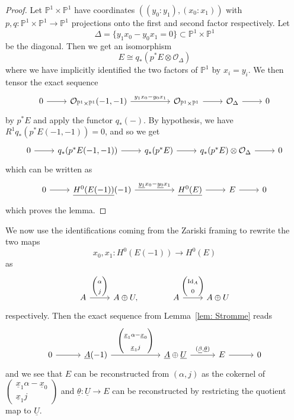 \documentclass{amsart}
\theoremstyle{definition}
\newcommand{\PP}{\mathbb{P}}
\newcommand{\OO}{\mathcal{O}}
\newcommand{\UL}[1]{\underline{#1}}
\newcommand{\Id}{\operatorname{Id}}
\begin{document}
\begin{proof}
Let $\PP^{1}\times \PP^{1}$ have coordinates
$((y_{0}:y_{1}),(x_{0}:x_{1}))$ with $p,q:\PP^{1}\times \PP^{1}\to
\PP^{1}$ projections onto the first and second factor respectively. Let 
\[
\Delta =\{y_{1}x_{0}-y_{0}x_{1} =0 \}\subset \PP^{1}\times \PP^{1}
\]
be the diagonal. Then we get an isomorphism
\[
E\cong q_{*}\left(p^{*}E\otimes \OO_{\Delta} \right)
\]
where we have implicitly identified the two factors of $\PP^{1}$ by
$x_{i}=y_{i}$.  We then tensor the exact sequence
\[
\begin{tikzcd}
0\arrow[r] & \OO_{\PP^{1}\times \PP^{1}}(-1,-1)
\arrow{rr}{y_{1}x_{0}-y_{0}x_{1}}& & \OO_{\PP^{1}\times \PP^{1}}
\arrow[r]& \OO_{\Delta} \arrow[r]& 0
\end{tikzcd}
\]
by $p^{*}E$ and apply the functor $q_{*}(-)$. By hypothesis, we have
$R^{1}q_{*}(p^{*}E(-1,-1))=0$, and so we get
\[
\begin{tikzcd}
0\arrow[r] &q_{*}(p^{*}E(-1,-1)) \arrow[r] & q_{*}(p^{*}E) \arrow[r] &
q_{*}(p^{*}E)\otimes \OO_{\Delta} \arrow[r] & 0 
\end{tikzcd}
\]
which can be written as 
\[
\begin{tikzcd}
0\arrow[r] &\UL{H^{0}(E(-1))}(-1)
\arrow{rr}{\UL{y_{1}}x_{0}-\UL{y_{0}}x_{1}} && \UL{H^{0}(E)} \arrow[r]
&E \arrow[r] &0
\end{tikzcd}
\]
which proves the lemma.
\end{proof}

We now use the identifications coming from the Zariski framing to
rewrite the two maps
\[
x_{0},x_{1}: H^{0}(E(-1)) \to H^{0}(E)
\]
as
\[
\begin{tikzcd}
A \arrow{r}{\begin{pmatrix} \alpha \\ j  \end{pmatrix}} &A\oplus U,
\quad & A \arrow{r}{\begin{pmatrix} \Id_{A} \\ 0  \end{pmatrix}} &A\oplus U
\end{tikzcd}
\]
respectively. Then the exact sequence from Lemma~\ref{lem: Stromme}
reads
\begin{equation}\label{eqn: A(-1)->A+U->E}
\begin{tikzcd}[column sep=3em]
  0
    \arrow[r]
  & \UL{A}(-1)
    \arrow[rr,"{%
      \begin{pmatrix}
        \UL{x}_{1}\alpha - \UL{x}_{0} \\[3pt]
        \UL{x}_{1}j
      \end{pmatrix}
    }"]
  && \UL{A}\oplus \UL{U}
    \arrow[r,"{(\UL{\beta},\UL{\theta})}"]
  & E
    \arrow[r]
  & 0
\end{tikzcd}
\end{equation}
and we see that $E$ can be reconstructed from $(\alpha ,j)$ as
the cokernel of $ \left(\begin{smallmatrix} \UL{x}_{1} \alpha -\UL{x}_{0}\\ 
\UL{x}_{1}j \end{smallmatrix} \right)$ and $\UL{\theta}:\UL{U}\to E$
can be reconstructed by restricting the quotient map to $\UL{U}$.
\end{document}
